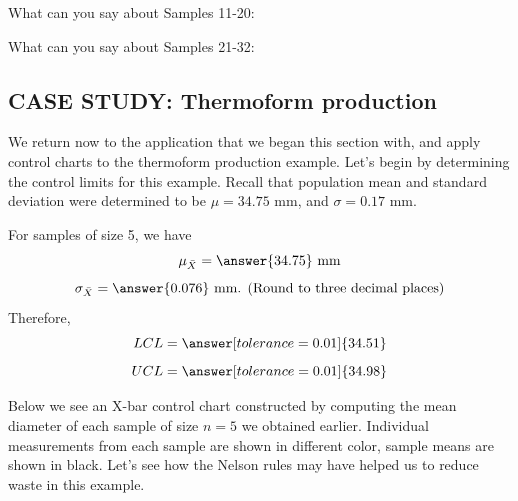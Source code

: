 \documentclass{ximera}
\begin{document}
\begin{problem}
What can you say about Samples  11-20:
\begin{multipleChoice}
\end{multipleChoice}

What can you say about Samples  21-32:
\begin{multipleChoice}
\end{multipleChoice}
\end{problem}

\subsection*{CASE STUDY: Thermoform production}

We return now to the application that we began this section with, and apply control charts to the thermoform production example.
Let's begin by determining the control limits for this example.  Recall that population mean and standard deviation were determined to be $\mu=34.75$ mm, and $\sigma=0.17$ mm.  

\begin{question}\label{quest:contLimTh}
For samples of size 5, we have 
$$\mu_{\bar{X}}=\answer{34.75}\mbox{ mm}$$
$$\sigma_{\bar{X}}=\answer{0.076}\mbox{ mm. (Round to three decimal places)}$$
Therefore,
$$LCL=\answer[tolerance=0.01]{34.51}$$
$$UCL=\answer[tolerance=0.01]{34.98}$$
\end{question}

Below we see an X-bar control chart constructed by computing the mean diameter of each sample of size $n=5$ we obtained earlier.  Individual measurements from each sample are shown in different color, sample means are shown in black. Let's see how the Nelson rules may have helped us to reduce waste in this example.
\end{document}
